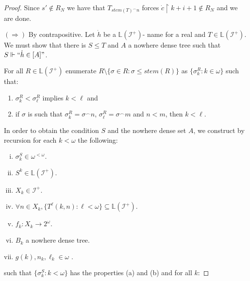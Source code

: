 \documentclass[10pt,a4paper]{amsart}
\newcommand{\id}{\mathcal{I}}
\newcommand{\li}{\mathbb{L}(\mathcal{I}^+)}
\begin{document}
\begin{proof}
Since $s'\notin R_N$ we have that $T_{stem(T)^\frown n}$ forces $\dot c\upharpoonright k+i+1\not\in R_N$ and we are done.

$(\Rightarrow)$ By contrapositive. Let $\dot h$ be a $\li$- name for a real and $T\in \li$. We must show that there is $S\leq T$ and $A$ a nowhere dense tree such that $S\Vdash``\dot h\in [A]"$.


For all $R\in \li$ enumerate $R\setminus \{\sigma\in R:\sigma\leq stem(R)\}$ as $\{\sigma_k^R:k\in \omega\}$ such that:

\begin{enumerate}
    \item[(a)] $\sigma_k^R<\sigma_\ell^R$ implies $k<\ell$ and
    \item[(b)] if $\sigma$ is such that $\sigma_k^R=\sigma^\frown n$, $\sigma_\ell^R=\sigma^\frown m$ and $n<m$, then $k<\ell$.
\end{enumerate}

In order to obtain the condition $S$ and the nowhere dense set $A$, we construct by recursion for each $k<\omega$ the following:

\begin{enumerate}[(i)]
    \item $\sigma_k^S\in\omega^{<\omega}$.
    \item $S^k\in \li$.
    \item $X_{k}\in \id^+$.
    \item $\forall n\in X_k, \{T^{\ell}(k,n):\ell<\omega\} \subseteq \li$.
    \item $f_k:X_{k}\rightarrow2^\omega$.
    \item $B_{k}$ a nowhere dense tree.
    \item $g(k),n_k, \ell_k\in\omega$ .
\end{enumerate}


such that $\{\sigma^S_{k}:k<\omega\}$ has the properties (a) and (b) and for all $k$:


\end{proof}
\end{document}

